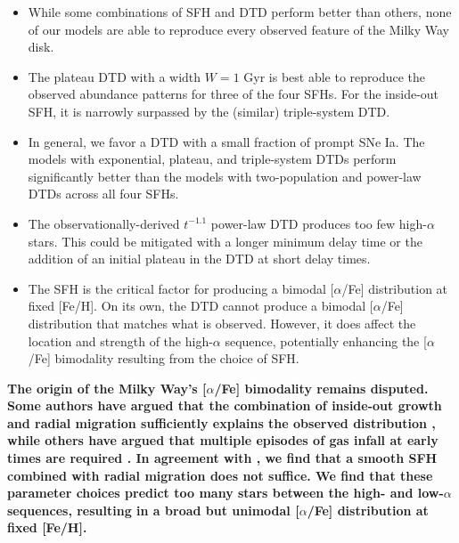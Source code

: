 \documentclass[twocolumn,twocolappendix,linenumbers]{aastex631}
\newcommand{\aFe}{[$\alpha$/Fe]\xspace}
\begin{document}
\begin{itemize}
    \item While some combinations of SFH and DTD perform better than others, none of our models are able to reproduce every observed feature of the Milky Way disk.
    
    \item The plateau DTD with a width $W=1$ Gyr is best able to reproduce the observed abundance patterns for three of the four SFHs. For the inside-out SFH, it is narrowly surpassed by the (similar) triple-system DTD.

    \item In general, we favor a DTD with a small fraction of prompt SNe Ia. The models with exponential, plateau, and triple-system DTDs perform significantly better than the models with two-population and power-law DTDs across all four SFHs.

    \item The observationally-derived $t^{-1.1}$ power-law DTD produces too few high-$\alpha$ stars. This could be mitigated with a longer minimum delay time or the addition of an initial plateau in the DTD at short delay times.
    
    \item The SFH is the critical factor for producing a bimodal \aFe distribution at fixed [Fe/H]. On its own, the DTD cannot produce a bimodal \aFe distribution that matches what is observed. However, it does affect the location and strength of the high-$\alpha$ sequence, potentially enhancing the \aFe bimodality resulting from the choice of SFH.
\end{itemize}

{\bf The origin of the Milky Way's \aFe bimodality remains disputed. Some authors have argued that the combination of inside-out growth and radial migration sufficiently explains the observed distribution \citep[e.g.,][]{Kubryk2015-RadialMigrationEvolution,Sharma2021-RadialMigration,Chen2023-RadialMixingRedux,Prantzos2023-ThinThickDisks}, while others have argued that multiple episodes of gas infall at early times are required \citep[e.g.,][]{Chiappini1997-TwoInfall,Mackereth2018-AlphaBimodality,Spitoni2019-TwoInfall,Spitoni2020-TwoInfall,Spitoni2021-TwoInfall}. In agreement with , we find that a smooth SFH combined with radial migration does not suffice. We find that these parameter choices predict too many stars between the high- and low-$\alpha$ sequences, resulting in a broad but unimodal \aFe distribution at fixed [Fe/H].}
\end{document}
